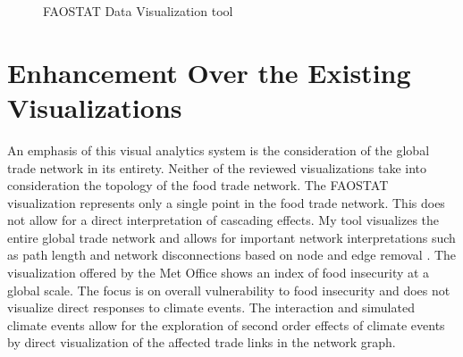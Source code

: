 \begin{figure}[htb]
	\caption{FAOSTAT Data Visualization tool}
	\label{faostatViz}
\end{figure}
\section{Enhancement Over the Existing Visualizations}
An emphasis of this visual analytics system is the consideration of the global trade network in its entirety. Neither of the reviewed visualizations take into consideration the topology of the food trade network. The FAOSTAT visualization represents only a single point in the food trade network. This does not allow for a direct interpretation of cascading effects. My tool visualizes the entire global trade network and allows for important network interpretations such as path length and network disconnections based on node and edge removal \citep{purchase1997aesthetic}. The visualization offered by the Met Office shows an index of food insecurity at a global scale. The focus is on overall vulnerability to food insecurity and does not visualize direct responses to climate events. The interaction and simulated climate events allow for the exploration of second order effects of climate events by direct visualization of the affected trade links in the network graph.\par
